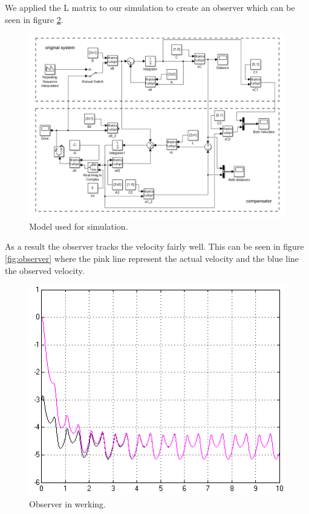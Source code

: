 \documentclass[final]{scrreprt} %
\begin{document}
We applied the L matrix to our simulation to create an observer which can be seen in figure \ref{fig:simcircuit}.

\begin{figure}[h!]
\centering
\includegraphics[width=\linewidth]{res/model-rest.png}
\caption{Model used for simulation.}
\label{fig:simcircuit}
\end{figure}

As a result the observer tracks the velocity fairly well. This can be seen in figure \ref{fig:observer} where the pink line represent the actual velocity and the blue line the observed velocity. 

\begin{figure}[h!]
\centering
\includegraphics[width=\linewidth]{res/observer-res.png}
\caption{Observer in werking.}
\label{fig:simcircuit}
\end{figure}
\end{document}

